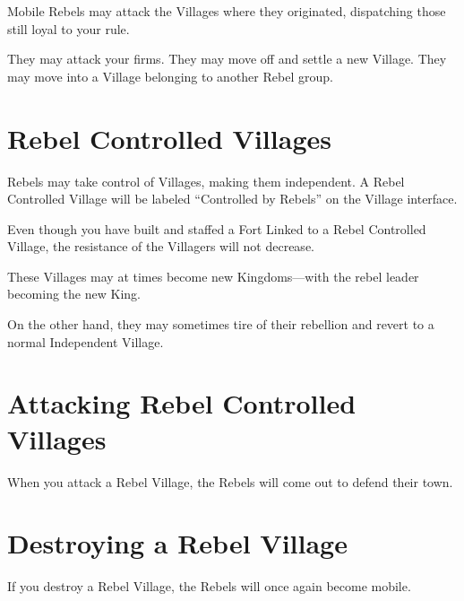 Mobile Rebels may attack the Villages where they originated, dispatching those still loyal to your rule.

They may attack your firms.
They may move off and settle a new Village.
They may move into a Village belonging to another Rebel group.

\section{Rebel Controlled Villages}

Rebels may take control of Villages, making them independent. A Rebel Controlled Village will be labeled “Controlled by Rebels” on the Village interface.

Even though you have built and staffed a Fort Linked to a Rebel Controlled Village, the resistance of the Villagers will not decrease.

These Villages may at times become new Kingdoms---with the rebel leader becoming the new King.

On the other hand, they may sometimes tire of their rebellion and revert to a normal Independent Village.

\section{Attacking Rebel Controlled Villages}

 When you attack a Rebel Village, the Rebels will come out to defend their town.

\section{Destroying a Rebel Village}


If you destroy a Rebel Village, the Rebels will once again become mobile.